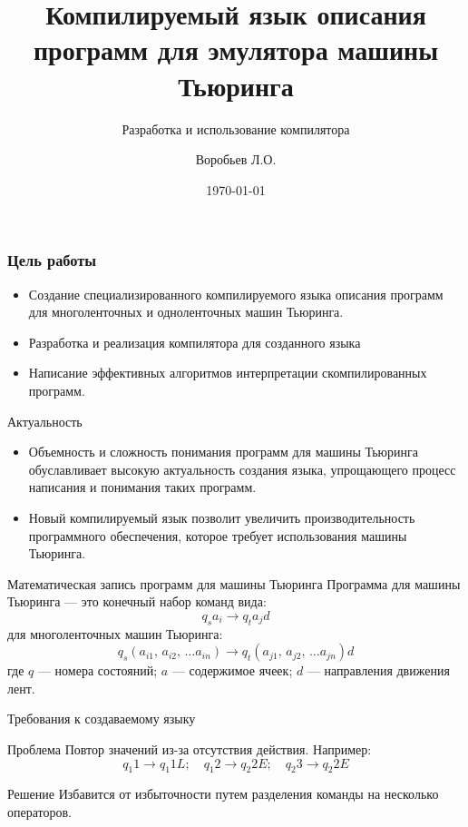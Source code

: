 \documentclass[14pt,pdf,hyperref={unicode}]{beamer}
\title{Компилируемый язык описания программ для эмулятора машины Тьюринга}
\subtitle{Разработка и использование компилятора}
\author{Воробьев Л.О.}
\date{\today}
\begin{document}
\begin{frame}
\titlepage
\end{frame} 

\begin{frame}
\frametitle{Цель работы} 
\begin{itemize}
	\item Создание специализированного компилируемого языка описания программ для многоленточных и одноленточных машин Тьюринга.
	\item Разработка и реализация компилятора для созданного языка 
	\item Написание эффективных алгоритмов интерпретации скомпилированных программ.
\end{itemize}
\end{frame}

\begin{frame}{Актуальность}
	\begin{itemize}
		\item Объемность и сложность понимания программ для машины Тьюринга обуславливает высокую актуальность создания языка, упрощающего процесс написания и понимания таких программ.
		\item Новый компилируемый язык позволит увеличить производительность программного обеспечения, которое требует использования машины Тьюринга.
	\end{itemize}
\end{frame}

\begin{frame}{Математическая запись программ для машины Тьюринга}
	Программа для машины Тьюринга --- это конечный набор команд вида:
	\begin{equation}\label{eq:command}
	q_s a_i \rightarrow q_t a_j d
	\end{equation}
	для многоленточных машин Тьюринга:
	\begin{equation}\label{eq:command_2}
	q_s \left( a_{i1},\,a_{i2},\,\ldots a_{in} \right) \rightarrow q_t \left( a_{j1},\,a_{j2},\,\ldots a_{jn} \right) d
	\end{equation}
	где $q$ --- номера состояний; $a$ --- содержимое ячеек; $d$ --- направления движения лент.
\end{frame}

\begin{frame}{Требования к создаваемому языку}
	\begin{block}{Проблема}
		Повтор значений из-за отсутствия действия. Например:
		$$ q_1 1 \rightarrow q_1 1 L ; \quad q_1 2 \rightarrow q_2 2 E ; \quad q_2 3 \rightarrow q_2 2 E $$
	\end{block}
		
	\begin{block}{Решение}
		Избавится от избыточности путем разделения команды на несколько операторов.
	\end{block}
\end{frame}
\end{document}
